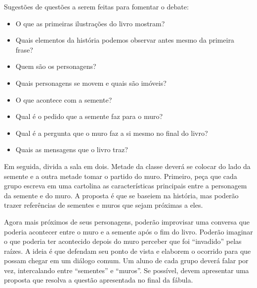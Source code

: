 \documentclass[11pt]{extarticle}
\begin{document}

Sugestões de questões a serem feitas para fomentar o debate:

\begin{itemize}

\item O que as primeiras ilustrações do livro mostram?

\item Quais elementos da história podemos observar antes mesmo da primeira frase?

\item Quem são os personagens?

\item Quais personagens se movem e quais são imóveis?

\item O que acontece com a semente?

\item Qual é o pedido que a semente faz para o muro?

\item Qual é a pergunta que o muro faz a si mesmo no final do livro?

\item Quais as mensagens que o livro traz?

\end{itemize}

Em seguida, divida a sala em dois. Metade da classe deverá se colocar do lado da semente e a outra metade tomar o partido do muro. Primeiro, peça que cada grupo escreva em uma cartolina as características principais entre a personagem da semente e do muro. A proposta é que se baseiem na história, mas poderão trazer referências de sementes e muros que sejam próximas a eles.



Agora mais próximos de seus personagens, poderão improvisar uma conversa que poderia acontecer entre o muro e a semente após o fim do livro. Poderão imaginar o que poderia ter acontecido depois do muro perceber que foi ``invadido'' pelas raízes. A ideia é que defendam seu ponto de vista e elaborem o ocorrido para que possam chegar em um diálogo comum. Um aluno de cada grupo deverá falar por vez, intercalando entre ``sementes'' e ``muros''. Se possível, devem apresentar uma proposta que resolva a questão apresentada no final da fábula.
\end{document}

